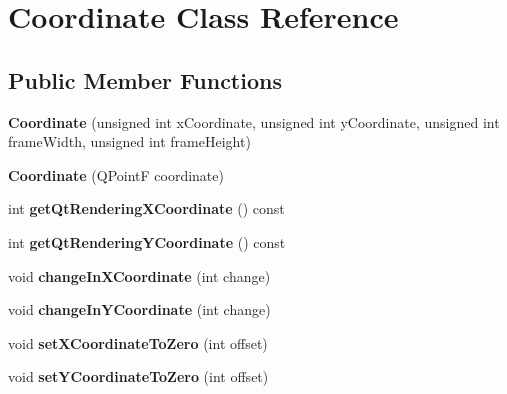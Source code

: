 \hypertarget{class_coordinate}{\section{Coordinate Class Reference}
\label{class_coordinate}
}
\subsection*{Public Member Functions}
\begin{DoxyCompactItemize}
\item 
\hypertarget{class_coordinate_a2abcffb39c9db2c4c69bc5d240d1105f}{{\bfseries Coordinate} (unsigned int x\+Coordinate, unsigned int y\+Coordinate, unsigned int frame\+Width, unsigned int frame\+Height)}\label{class_coordinate_a2abcffb39c9db2c4c69bc5d240d1105f}

\item 
\hypertarget{class_coordinate_a30d2ed7d5962619d7579a3e1247587ed}{{\bfseries Coordinate} (Q\+Point\+F coordinate)}\label{class_coordinate_a30d2ed7d5962619d7579a3e1247587ed}

\item 
\hypertarget{class_coordinate_a767930d8c725ea1bbce3a823245494b4}{int {\bfseries get\+Qt\+Rendering\+X\+Coordinate} () const }\label{class_coordinate_a767930d8c725ea1bbce3a823245494b4}

\item 
\hypertarget{class_coordinate_ad929742da59ccc0b3cb590aa766953a8}{int {\bfseries get\+Qt\+Rendering\+Y\+Coordinate} () const }\label{class_coordinate_ad929742da59ccc0b3cb590aa766953a8}

\item 
\hypertarget{class_coordinate_a8481ba6f79f9b7f6ac41a28119d251b9}{void {\bfseries change\+In\+X\+Coordinate} (int change)}\label{class_coordinate_a8481ba6f79f9b7f6ac41a28119d251b9}

\item 
\hypertarget{class_coordinate_ad2cd26113f8101771bea445fb5dc907f}{void {\bfseries change\+In\+Y\+Coordinate} (int change)}\label{class_coordinate_ad2cd26113f8101771bea445fb5dc907f}

\item 
\hypertarget{class_coordinate_a2d7e9109597d0554e5ac6db6800f208c}{void {\bfseries set\+X\+Coordinate\+To\+Zero} (int offset)}\label{class_coordinate_a2d7e9109597d0554e5ac6db6800f208c}

\item 
\hypertarget{class_coordinate_a1ab7964582737b9bd19788e08a8a8c6b}{void {\bfseries set\+Y\+Coordinate\+To\+Zero} (int offset)}\label{class_coordinate_a1ab7964582737b9bd19788e08a8a8c6b}


\end{DoxyCompactItemize}

